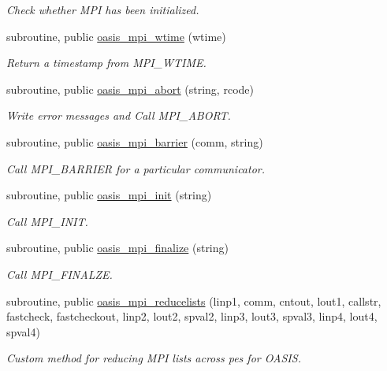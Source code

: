 \begin{DoxyCompactItemize}
\begin{DoxyCompactList}\small\item\em Check whether M\+PI has been initialized. \end{DoxyCompactList}\item 
subroutine, public \hyperlink{namespacemod__oasis__mpi_aa3786c2cab131c3834583e7943ba28c8}{oasis\+\_\+mpi\+\_\+wtime} (wtime)
\begin{DoxyCompactList}\small\item\em Return a timestamp from M\+P\+I\+\_\+\+W\+T\+I\+ME. \end{DoxyCompactList}\item 
subroutine, public \hyperlink{namespacemod__oasis__mpi_a5b21b6d8732d5f7b70d8b20cefe0072f}{oasis\+\_\+mpi\+\_\+abort} (string, rcode)
\begin{DoxyCompactList}\small\item\em Write error messages and Call M\+P\+I\+\_\+\+A\+B\+O\+RT. \end{DoxyCompactList}\item 
subroutine, public \hyperlink{namespacemod__oasis__mpi_aaf477847380fbbbc1341520b0b3e66da}{oasis\+\_\+mpi\+\_\+barrier} (comm, string)
\begin{DoxyCompactList}\small\item\em Call M\+P\+I\+\_\+\+B\+A\+R\+R\+I\+ER for a particular communicator. \end{DoxyCompactList}\item 
subroutine, public \hyperlink{namespacemod__oasis__mpi_aaf45f20e0000b32e71ec9ea8e806f57c}{oasis\+\_\+mpi\+\_\+init} (string)
\begin{DoxyCompactList}\small\item\em Call M\+P\+I\+\_\+\+I\+N\+IT. \end{DoxyCompactList}\item 
subroutine, public \hyperlink{namespacemod__oasis__mpi_a0a601a3f718c0704db99a21b2c43fbcd}{oasis\+\_\+mpi\+\_\+finalize} (string)
\begin{DoxyCompactList}\small\item\em Call M\+P\+I\+\_\+\+F\+I\+N\+A\+L\+ZE. \end{DoxyCompactList}\item 
subroutine, public \hyperlink{namespacemod__oasis__mpi_a95f6540150f7ab4e64697d2eabc2bf79}{oasis\+\_\+mpi\+\_\+reducelists} (linp1, comm, cntout, lout1, callstr, fastcheck, fastcheckout, linp2, lout2, spval2, linp3, lout3, spval3, linp4, lout4, spval4)
\begin{DoxyCompactList}\small\item\em Custom method for reducing M\+PI lists across pes for O\+A\+S\+IS. \end{DoxyCompactList}\end{DoxyCompactItemize}


